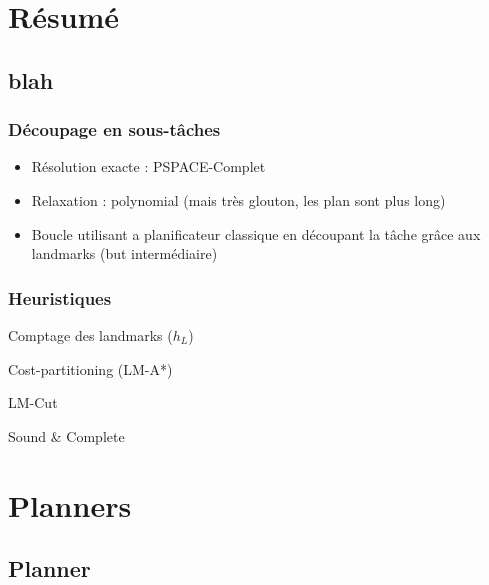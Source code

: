 \section{Résumé}
  \subsection*{blah}
\begin{frame}
  \frametitle{Découpage en sous-tâches}

  \begin{block}{}
    \begin{itemize}
      \item Résolution exacte : PSPACE-Complet
      \item Relaxation : polynomial (mais très glouton, les plan sont plus long)
      \item Boucle utilisant a planificateur classique en découpant la tâche grâce aux landmarks (but intermédiaire)
    \end{itemize}
      
      
  \end{block}
\end{frame}

\begin{frame}[allowframebreaks]
  \frametitle{Heuristiques}

  \begin{block}{Comptage des landmarks ($h_L$)}
    
  \end{block} 
  
  \begin{block}{Cost-partitioning (LM-A*)}
    
  \end{block}

  \begin{block}{LM-Cut}
    
    
  \end{block}

  \begin{block}{Sound \& Complete}
    
    
  \end{block}

\end{frame}

\section{Planners}
  \subsection*{Planner}

